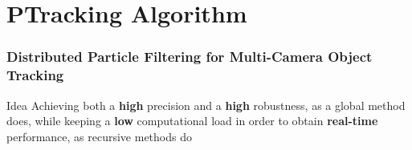 \section{PTracking Algorithm}

\begin{frame}
	\frametitle{Distributed Particle Filtering for Multi-Camera Object Tracking}
	
	\Large
	
	\begin{block}{Idea}
		Achieving both a \textbf{high} precision and a \textbf{high} robustness, as a
		global method does, while keeping a \textbf{low} computational load in order to
		obtain \textbf{real-time} performance, as recursive methods do
	\end{block}
\end{frame}

